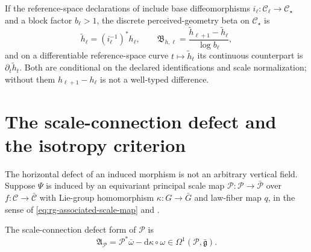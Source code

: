 If the reference-space declarations of  include base diffeomorphisms
\(i_\ell:\mathcal C_\ell\to\mathcal C_\star\) and a block factor \(b_\ell>1\), the discrete
perceived-geometry beta on \(\mathcal C_\star\) is
\begin{equation}
\widetilde h_\ell=(i_\ell^{-1})^*h_\ell,
\qquad
\mathfrak B_{h,\ell}
=\frac{\widetilde h_{\ell+1}-\widetilde h_\ell}{\log b_\ell},
\label{eq:pb-metric-beta-reference}
\end{equation}
and on a differentiable reference-space curve \(t\mapsto\widetilde h_t\) its continuous counterpart
is \(\partial_t\widetilde h_t\). Both are conditional on the declared
identifications and scale normalization; without them \(h_{\ell+1}-h_\ell\) is not a well-typed
difference.

\section{The scale-connection defect and the isotropy criterion}
\label{sec:pb-isotropy}

The horizontal defect of an induced morphism is not an arbitrary vertical field. Suppose \(\Psi\) is
induced by an equivariant principal scale map \(\mathcal P:\mathscr P\to\bar{\mathscr P}\) over
\(f:\mathcal C\to\bar{\mathcal C}\) with Lie-group homomorphism \(\kappa:G\to\bar G\) and law-fiber map
\(q\), in the sense of \eqref{eq:rg-associated-scale-map} and
.

The scale-connection defect form of \(\mathcal P\) is
\begin{equation}
\mathfrak A_{\mathcal P}
=\mathcal P^*\bar\omega-\mathrm d\kappa\circ\omega
\in\Omega^1(\mathscr P,\bar{\mathfrak g}).
\label{eq:pb-scale-connection-defect}
\end{equation}

